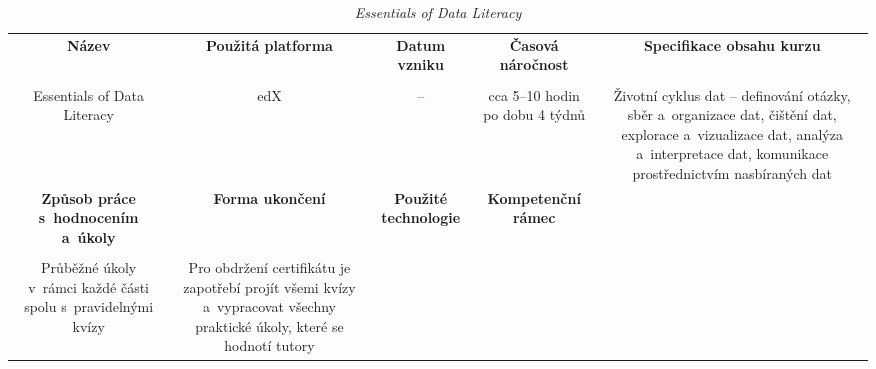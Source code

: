 \begin{landscape}

\begin{table}[htbp]

\renewcommand\thetable{4}

\caption{\textit{Essentials of Data Literacy}}\label{tab4}

\footnotesize

{

\justifying

\begin{tabularx}{\linewidth}{CCCCC}

\toprule

\textbf{Název} &

\textbf{Použitá platforma} &

\textbf{Datum vzniku} &

\textbf{Časová náročnost} &
 
\textbf{Specifikace obsahu kurzu}

\\

\tabularnewline
\midrule

Essentials of Data Literacy

&

edX

&

–

&

cca 5–10 hodin po dobu 4 týdnů

&

Životní cyklus dat – definování otázky, sběr a~organizace dat, čištění dat, explorace a~vizualizace dat, analýza a~interpretace dat, komunikace prostřednictvím nasbíraných dat

\\
\toprule

\textbf{Způsob práce s~hodnocením a~úkoly} &

\textbf{Forma ukončení} &

\textbf{Použité technologie} &

\textbf{Kompetenční rámec} 

\\

\tabularnewline
\midrule

Průběžné úkoly v~rámci každé části spolu s~pravidelnými kvízy

&

Pro obdržení certifikátu je zapotřebí projít všemi kvízy a~vypracovat všechny praktické úkoly, které se hodnotí tutory


\end{tabularx}}
\end{table}
\end{landscape}
